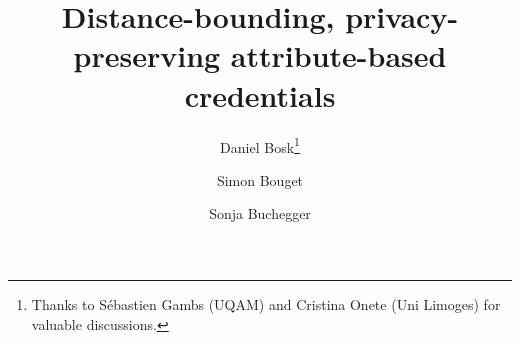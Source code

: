 \documentclass[USenglish]{article}
\begin{document}
\author{Daniel Bosk\thanks{%
    Thanks to Sébastien Gambs (UQAM) and Cristina Onete (Uni Limoges) for 
    valuable discussions.
}}
\author{Simon Bouget}
\author{Sonja Buchegger}

\title{%
  Distance-bounding, privacy-preserving attribute-based credentials
}


\end{document}
